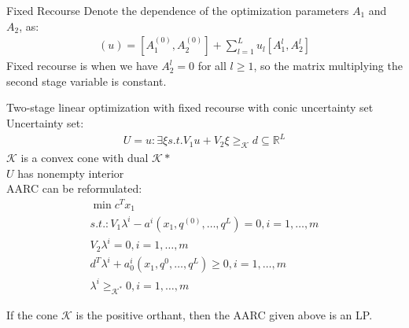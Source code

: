 \documentclass{beamer}
\begin{document}
\begin{frame}{Fixed Recourse}
Denote the dependence of the optimization parameters $A_{1}$ and $A_{2}$, as:
\begin{align*}
[A_{1}, A_{2}](u) = [A_{1}^{(0)}, A_{2}^{(0)}] + \sum^{L}_{l=1}u_{l}[A_{1}^{l}, A_{2}^{l}]
\end{align*}
Fixed recourse is when we have $A_{2}^{l} = 0$ for all $l \geq 1$, so the matrix multiplying the second stage variable is constant.
\end{frame}

\begin{frame}{Two-stage linear optimization with fixed recourse with conic uncertainty set}
Uncertainty set:
\begin{align*}
U = {u : \exists \xi s.t. V_{1}u + V_{2}\xi \geq_{\mathcal{K}} d} \subseteq \mathbb{R}^{L}
\end{align*}
$\mathcal{K}$ is a convex cone with dual $\mathcal{K*}$ \\
$U$ has nonempty interior \\
AARC can be reformulated:
\begin{align*}
\min c^{T}x_{1} \\
s.t.: V_{1}\lambda^{i} - a^{i}(x_{1},q^{(0)},\dots,q^{L}) = 0, i=1,\dots,m \\
V_{2}\lambda^{i} = 0, i=1,\dots,m \\
d^{T}\lambda^{i} + a_{0}^{i}(x_{1},q^{0},\dots,q^{L}) \geq 0, i = 1,\dots,m \\
\lambda^{i} \geq_{\mathcal{K}^{*}} 0, i=1,\dots,m
\end{align*}

If the cone $\mathcal{K}$ is the positive orthant, then the AARC given above is an LP.
\end{frame}
\end{document}
